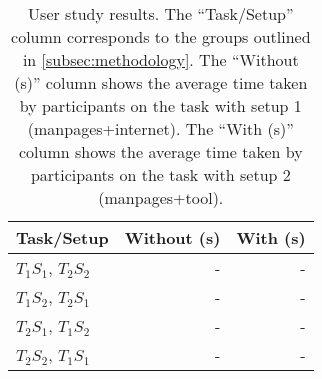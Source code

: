 \begin{table}[ht]
    \begin{center}
    \begin{tabular}{lrr}
        \textbf{Task/Setup} & \textbf{Without (s)} & \textbf{With (s)} \\
        \hline
        $T_1 S_1$, $T_2 S_2$ & - & - \\
        $T_1 S_2$, $T_2 S_1$ & - & - \\
        $T_2 S_1$, $T_1 S_2$ & - & - \\
        $T_2 S_2$, $T_1 S_1$ & - & - \\
    \end{tabular}
    \end{center}
    \caption{User study results. The ``Task/Setup'' column corresponds to the
        groups outlined in \autoref{subsec:methodology}. The ``Without (s)''
        column shows the average time taken by participants on the task with
        setup 1 (manpages+internet). The ``With (s)'' column shows the average
        time taken by participants on the task with setup 2 (manpages+tool).}
\end{table}

